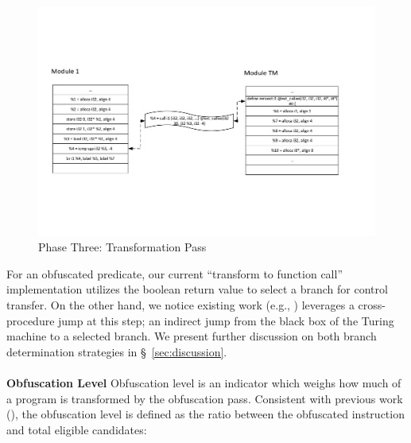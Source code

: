 \documentclass[lnicst]{svmultln}
\begin{document}
\begin{figure}
 \includegraphics[width=\linewidth]{transform_pass.pdf}
 \caption{Phase Three: Transformation Pass}
 \label{fig:six}
\end{figure}

For an obfuscated predicate, our current ``transform to function call''
implementation utilizes the boolean return value to select a branch for control
transfer. On the other hand, we notice existing work (e.g., \cite{Ma, Maieee})
leverages a cross-procedure jump at this step; an indirect jump from the black
box of the Turing machine to a selected branch. We present further discussion on
both branch determination strategies in \S~\ref{sec:discussion}.
\\\\
\noindent \textbf{Obfuscation Level} Obfuscation level is an indicator which
weighs how much of a program is transformed by the obfuscation pass. Consistent
with previous work (\cite{Trans}), the obfuscation level is defined as the ratio
between the obfuscated instruction and total eligible candidates:
\end{document}
